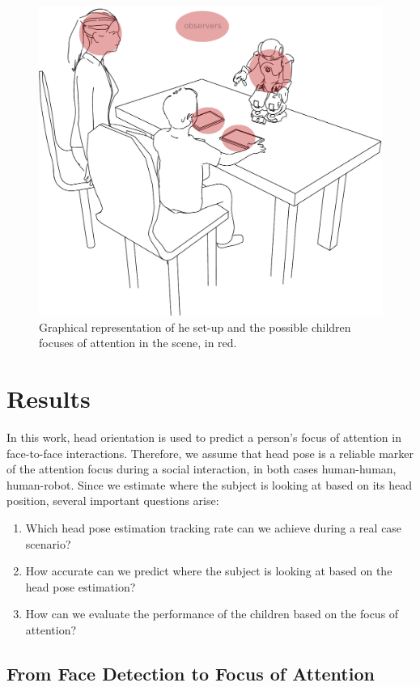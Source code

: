 \documentclass{sig-alternate}
\begin{document}
\begin{figure}[h!]
    \centering
    \includegraphics[width=0.7\columnwidth]{drawSetup}
    \caption{\small Graphical representation of he set-up and the possible children focuses of attention in the scene, in red.}
    \label{drawSetup}
\end{figure}


\section{Results}

In this work, head orientation is used to predict a person's focus of attention in face-to-face interactions. Therefore, we assume that head pose is a reliable marker of the attention focus during a social interaction, in both cases human-human, human-robot. Since we estimate where the subject is looking at based on its head position, several important questions arise:

\begin{enumerate}
\item Which head pose estimation tracking rate can we achieve during a real case scenario?  
\item How accurate can we predict where the subject is looking at based on the head pose estimation?
\item How can we evaluate the performance of the children based on the focus of attention?
\end{enumerate}


\subsection{From Face Detection to Focus of Attention}
\end{document}
